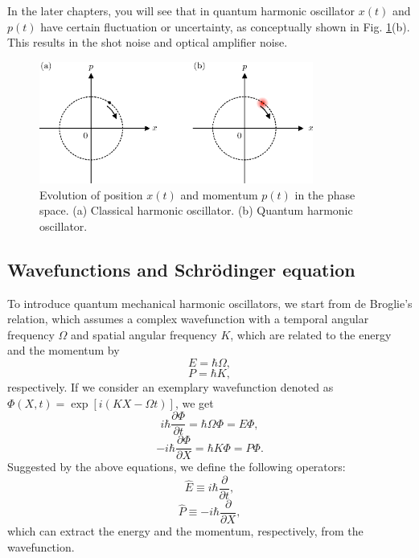 \documentclass{book}
\begin{document}
In the later chapters, you will see that in quantum harmonic oscillator $x(t)$ and $p(t)$ have certain fluctuation or uncertainty, as conceptually shown in Fig. {\ref{fig:classical_phase_space}}(b). This results in the shot noise and optical amplifier noise.

\begin{figure}
  \centering
  \includegraphics[width=9cm]{fig/3-1_phase_space.eps} 
  \caption{Evolution of position $x(t)$ and momentum $p(t)$ in the phase space. (a) Classical harmonic oscillator. (b) Quantum harmonic oscillator. }
  \label{fig:classical_phase_space}
\end{figure}


\subsection{Wavefunctions and Schr\"odinger equation}
To introduce quantum mechanical harmonic oscillators, we start from de Broglie's relation, which assumes a complex wavefunction with a temporal angular frequency $\Omega$ and spatial angular frequency $K$, which are related to the energy and the momentum by
\begin{equation}
  E = \hbar \Omega,
\end{equation}
\begin{equation}
  P = \hbar K,
\end{equation}
respectively. If we consider an exemplary wavefunction denoted as $\Phi(X, t)= \exp[i(KX-\Omega t)]$, we get 
\begin{equation}
 i\hbar\frac{\partial\Phi}{\partial t} = \hbar\Omega \Phi = E\Phi,
\end{equation}
\begin{equation}
-i\hbar \frac {\partial \Phi}{\partial X} = \hbar K\Phi = P\Phi.
\end{equation}
Suggested by the above equations, we define the following operators:
\begin{equation}
	\hat E \equiv i\hbar \frac{\partial}{\partial t}, 
 \label{eq:energy_operator}
\end{equation}
\begin{equation}
  \hat P \equiv -i\hbar \frac{\partial}{\partial X},
  \label{eq:momentum_operator}
\end{equation}
which can extract the energy and the momentum, respectively, from the wavefunction.
\end{document}
